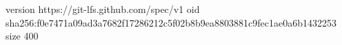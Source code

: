 version https://git-lfs.github.com/spec/v1
oid sha256:f0e7471a09ad3a7682f17286212c5f02b8b9ea8803881c9fec1ae0a6b1432253
size 400
